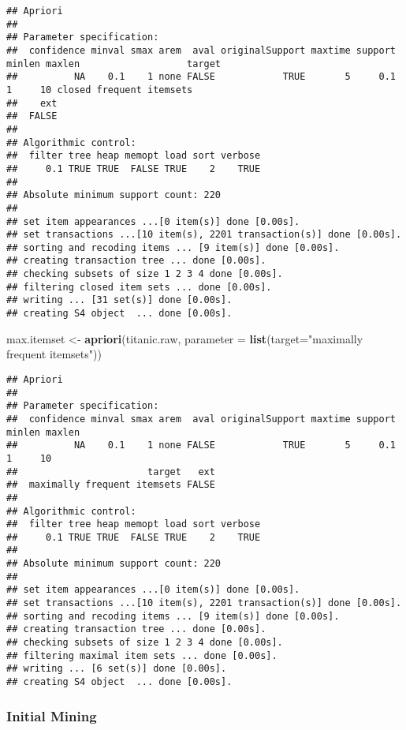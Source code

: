 \documentclass[]{article}
\newenvironment{Shaded}{\begin{snugshade}}{\end{snugshade}}
\newcommand{\DataTypeTok}[1]{\textcolor[rgb]{0.13,0.29,0.53}{#1}}
\newcommand{\KeywordTok}[1]{\textcolor[rgb]{0.13,0.29,0.53}{\textbf{#1}}}
\newcommand{\NormalTok}[1]{#1}
\newcommand{\StringTok}[1]{\textcolor[rgb]{0.31,0.60,0.02}{#1}}
\begin{document}
\begin{verbatim}
## Apriori
## 
## Parameter specification:
##  confidence minval smax arem  aval originalSupport maxtime support minlen maxlen                   target
##          NA    0.1    1 none FALSE            TRUE       5     0.1      1     10 closed frequent itemsets
##    ext
##  FALSE
## 
## Algorithmic control:
##  filter tree heap memopt load sort verbose
##     0.1 TRUE TRUE  FALSE TRUE    2    TRUE
## 
## Absolute minimum support count: 220 
## 
## set item appearances ...[0 item(s)] done [0.00s].
## set transactions ...[10 item(s), 2201 transaction(s)] done [0.00s].
## sorting and recoding items ... [9 item(s)] done [0.00s].
## creating transaction tree ... done [0.00s].
## checking subsets of size 1 2 3 4 done [0.00s].
## filtering closed item sets ... done [0.00s].
## writing ... [31 set(s)] done [0.00s].
## creating S4 object  ... done [0.00s].
\end{verbatim}

\begin{Shaded}
\begin{Highlighting}[]
\NormalTok{max.itemset <-}\StringTok{ }\KeywordTok{apriori}\NormalTok{(titanic.raw, }\DataTypeTok{parameter =} \KeywordTok{list}\NormalTok{(}\DataTypeTok{target=}\StringTok{"maximally frequent itemsets"}\NormalTok{))}
\end{Highlighting}
\end{Shaded}

\begin{verbatim}
## Apriori
## 
## Parameter specification:
##  confidence minval smax arem  aval originalSupport maxtime support minlen maxlen
##          NA    0.1    1 none FALSE            TRUE       5     0.1      1     10
##                       target   ext
##  maximally frequent itemsets FALSE
## 
## Algorithmic control:
##  filter tree heap memopt load sort verbose
##     0.1 TRUE TRUE  FALSE TRUE    2    TRUE
## 
## Absolute minimum support count: 220 
## 
## set item appearances ...[0 item(s)] done [0.00s].
## set transactions ...[10 item(s), 2201 transaction(s)] done [0.00s].
## sorting and recoding items ... [9 item(s)] done [0.00s].
## creating transaction tree ... done [0.00s].
## checking subsets of size 1 2 3 4 done [0.00s].
## filtering maximal item sets ... done [0.00s].
## writing ... [6 set(s)] done [0.00s].
## creating S4 object  ... done [0.00s].
\end{verbatim}

\hypertarget{initial-mining}{%
\subsubsection{Initial Mining}\label{initial-mining}}
\end{document}
